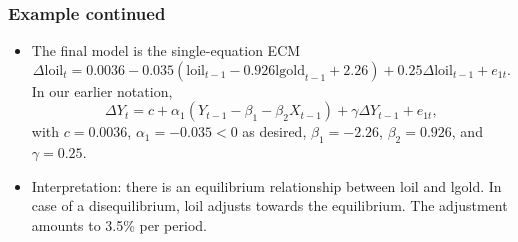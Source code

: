 \begin{frame}\frametitle{Example continued}
\begin{itemize}
\item The final model is the single-equation ECM
\[
\Delta \textrm{loil}_t=0.0036-0.035(\textrm{loil}_{t-1}-0.926\textrm{lgold}_{t-1}+2.26)+0.25\Delta\textrm{loil}_{t-1}+e_{1t}.
\]
In our earlier notation,
\[
\Delta Y_t=c+\alpha_1(Y_{t-1}-\beta_1-\beta_2X_{t-1})+\gamma\Delta Y_{t-1} +e_{1t},
\]
with $c=0.0036$, $\alpha_1=-0.035<0$ as desired, $\beta_1=-2.26$, $\beta_2=0.926$, and $\gamma=0.25$.
\item Interpretation: there is an equilibrium relationship between \textrm{loil} and \textrm{lgold}. In case of a disequilibrium, \textrm{loil} adjusts towards the equilibrium. The adjustment amounts to 3.5\% per period.
\end{itemize}
\end{frame}

